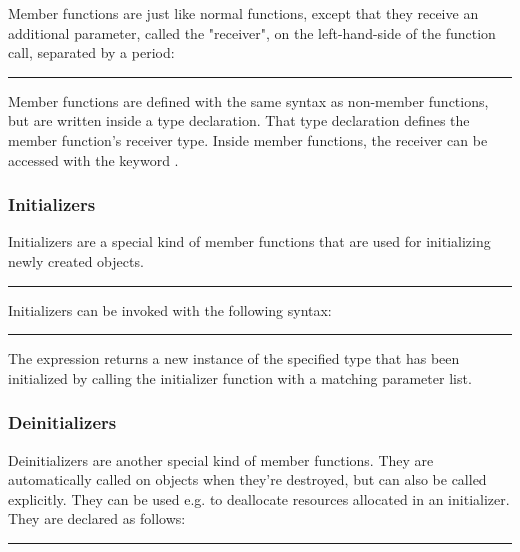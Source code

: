 Member functions are just like normal functions, except that they receive an
additional parameter, called the "receiver", on the left-hand-side of the
function call, separated by a period:

\begin{grammar}
\rule{member-function-call}    \code{(}  \code{)}
\end{grammar}

Member functions are defined with the same syntax as non-member functions, but
are written inside a type declaration. That type declaration defines the member
function's receiver type. Inside member functions, the receiver can be accessed
with the keyword .

\subsubsection{Initializers}

Initializers are a special kind of member functions that are used for
initializing newly created objects.

\begin{grammar}
\rule{initializer-definition}  \code{(}  \code{)} \code{\{}  \code{\}}
\end{grammar}

Initializers can be invoked with the following syntax:

\begin{grammar}
\rule{initializer-call}  \code{(}  \code{)}
\end{grammar}

The  expression returns a new instance of the
specified type that has been initialized by calling the initializer function
with a matching parameter list.

\subsubsection{Deinitializers}

Deinitializers are another special kind of member functions. They are
automatically called on objects when they're destroyed, but can also be called
explicitly. They can be used e.g. to deallocate resources allocated in an
initializer. They are declared as follows:

\begin{grammar}
\rule{deinitializer-definition}  \code{(} \code{)} \code{\{}  \code{\}}
\end{grammar}

